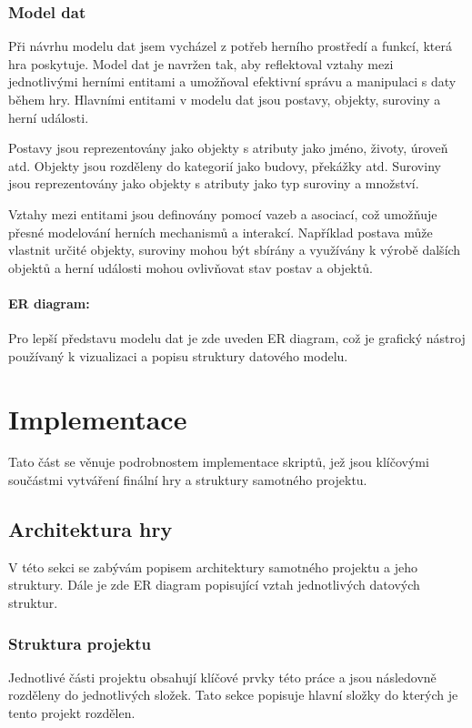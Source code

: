 
\subsection{Model dat}
Při návrhu modelu dat jsem vycházel z potřeb herního prostředí a funkcí, která hra poskytuje. Model dat je navržen tak, aby reflektoval vztahy mezi jednotlivými herními entitami a umožňoval efektivní správu a manipulaci s daty během hry. Hlavními entitami v modelu dat jsou postavy, objekty, suroviny a herní události.

Postavy jsou reprezentovány jako objekty s atributy jako jméno, životy, úroveň atd. Objekty jsou rozděleny do kategorií jako budovy, překážky atd. Suroviny jsou reprezentovány jako objekty s atributy jako typ suroviny a množství.

Vztahy mezi entitami jsou definovány pomocí vazeb a asociací, což umožňuje přesné modelování herních mechanismů a interakcí. Například postava může vlastnit určité objekty, suroviny mohou být sbírány a využívány k výrobě dalších objektů a herní události mohou ovlivňovat stav postav a objektů.

\subsubsection{ER diagram:}
Pro lepší představu modelu dat je zde uveden ER diagram, což je grafický nástroj používaný k vizualizaci a popisu struktury datového modelu.



\chapter{Implementace}
\label{implementace}
Tato část se věnuje podrobnostem implementace skriptů, jež jsou klíčovými součástmi vytváření finální hry a struktury samotného projektu.

\section{Architektura hry}
V této sekci se zabývám popisem architektury samotného projektu a jeho struktury. Dále je zde ER diagram popisující vztah jednotlivých datových struktur.

\subsection{Struktura projektu}
Jednotlivé části projektu obsahují klíčové prvky této práce a jsou následovně rozděleny do jednotlivých složek. Tato sekce popisuje hlavní složky do kterých je tento projekt rozdělen.

